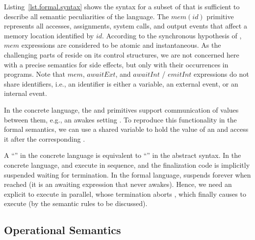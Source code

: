 Listing~\ref{lst.formal.syntax} shows the syntax for a subset of \CEU that is 
sufficient to describe all semantic peculiarities of the language.
%
The $mem(id)$ primitive represents all accesses, assignments, system calls, and
output events that affect a memory location identified by $id$.
%
According to the synchronous hypothesis of \CEU, $mem$ expressions are 
considered to be atomic and instantaneous.
%
As the challenging parts of \CEU reside on its control structures, we are not 
concerned here with a precise semantics for side effects, but only with their 
occurrences in programs.
%
%
Note that $mem$, $awaitExt$, and $awaitInt$ / $emitInt$ expressions do not
share identifiers, i.e., an identifier is either a variable, an external event,
or an internal event.

In the concrete language, the  and  primitives support
communication of values between them, e.g., an  awakes
 setting .
To reproduce this functionality in the formal semantics, we can use a shared
variable to hold the value of an  and access it after the
corresponding .

A ``'' in the concrete language is
equivalent to ``'' in the abstract syntax.
In the concrete language,  and  execute in sequence, and
the finalization code  is implicitly suspended waiting for 
termination.
In the formal language,  suspends forever when reached (it is an
awaiting expression that never awakes).
Hence, we need an explicit  to execute  in parallel, whose
termination aborts , which finally causes  to execute
(by the semantic rules to be discussed).

\subsection{Operational Semantics}

